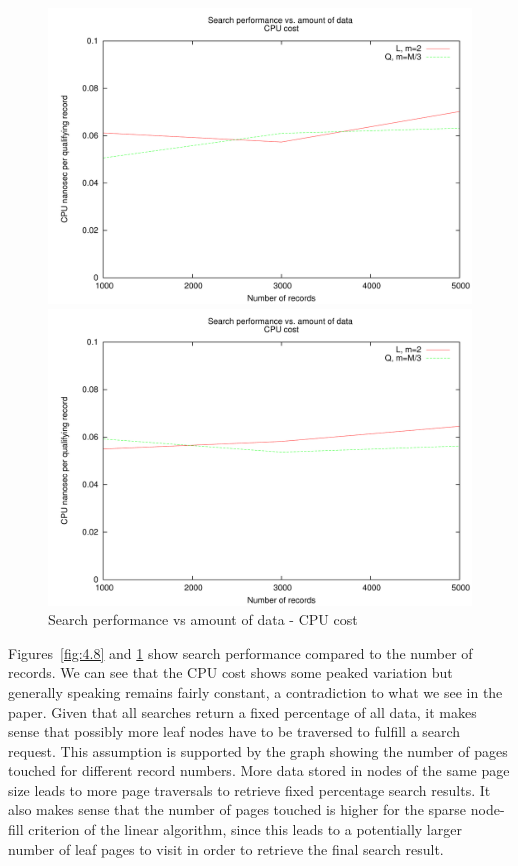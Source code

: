 \begin{figure}
\centering
\begin{minipage}{0.49\textwidth}
\centering
\includegraphics[width=\textwidth]{fig/random/figure-4-9.pdf}
\end{minipage}
\begin{minipage}{0.49\textwidth}
\centering
\includegraphics[width=\textwidth]{fig/usppp/figure-4-9.pdf}
\end{minipage}
\caption{Search performance vs amount of data - CPU cost}
\label{fig:4.9}
\end{figure}

Figures~\ref{fig:4.8} and \ref{fig:4.9} show search performance compared to the number of records. We can see that the CPU cost shows some peaked variation but generally speaking remains fairly constant, a contradiction to what we see in the paper. Given that all searches return a fixed percentage of all data, it makes sense that possibly more leaf nodes have to be traversed to fulfill a search request. This assumption is supported by the graph showing the number of pages touched for different record numbers. More data stored in nodes of the same page size leads to more page traversals to retrieve fixed percentage search results. It also makes sense that the number of pages touched is higher for the sparse node-fill criterion of the linear algorithm, since this leads to a potentially larger number of leaf pages to visit in order to retrieve the final search result.

